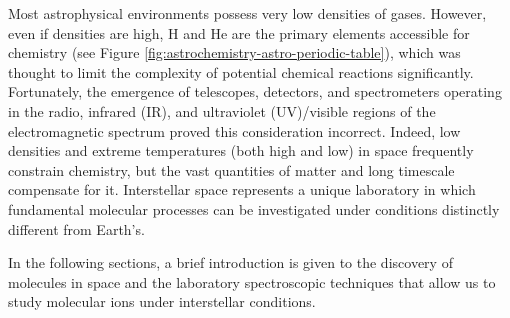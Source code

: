 Most astrophysical environments possess very low densities of gases. However, even if densities are high, H and He are 
the primary elements accessible for chemistry (see Figure \ref{fig:astrochemistry-astro-periodic-table}), which was 
thought to limit the complexity of potential chemical reactions significantly. Fortunately, the emergence of 
telescopes, detectors, and spectrometers operating in the radio, infrared (IR), and ultraviolet (UV)/visible regions of 
the electromagnetic spectrum proved this consideration incorrect. Indeed, low densities and extreme temperatures (both 
high and low) in space frequently constrain chemistry, but the vast quantities of matter and long timescale compensate 
for it. Interstellar space represents a unique laboratory in which fundamental molecular processes can be investigated 
under conditions distinctly different from Earth's.

In the following sections, a brief introduction is given to the discovery of molecules in space and the laboratory 
spectroscopic techniques that allow us to study molecular ions under interstellar conditions.
